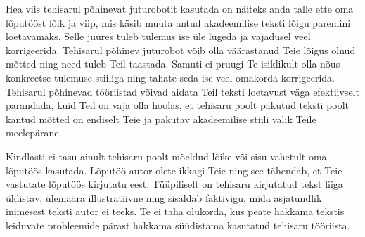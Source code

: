 Hea viis tehisarul põhinevat juturobotit kasutada on näiteks anda talle ette oma lõputööst lõik ja viip, mis käsib muuta antud akadeemilise teksti lõigu paremini loetavamaks. Selle juures tuleb tulemus ise üle lugeda ja vajadusel veel korrigeerida. Tehisarul põhinev juturobot võib olla väärastanud Teie lõigus olnud mõtted ning need tuleb Teil taastada. Samuti ei pruugi Te isiklikult olla nõus konkreetse tulemuse stiiliga ning tahate seda ise veel omakorda korrigeerida. Tehisarul põhinevad tööriistad võivad aidata Teil teksti loetavust väga efektiivselt parandada, kuid Teil on vaja olla hoolas, et tehisaru poolt pakutud teksti poolt kantud mõtted on endiselt Teie ja pakutav akadeemilise stiili valik Teile meelepärane.

Kindlasti ei tasu ainult tehisaru poolt mõeldud lõike või sisu vahetult oma lõputöös kasutada. Lõputöö autor olete ikkagi Teie ning see tähendab, et Teie vastutate lõputöös kirjutatu eest. Tüüpiliselt on tehisaru kirjutatud tekst liiga üldistav, ülemäära illustratiivne ning sisaldab faktivigu, mida asjatundlik inimesest teksti autor ei teeks. Te ei taha olukorda, kus peate hakkama tekstis leiduvate probleemide pärast hakkama süüdistama kasutatud tehisaru tööriista.
